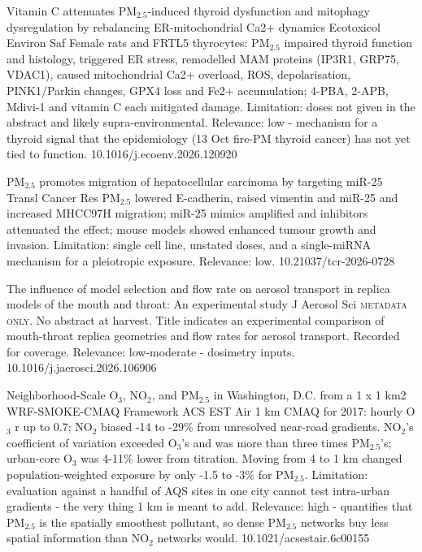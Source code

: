 \documentclass[10pt]{article}
\begin{document}
{Vitamin C attenuates PM$_{2.5}$-induced thyroid dysfunction and mitophagy dysregulation by rebalancing ER-mitochondrial Ca2+ dynamics}
{Ecotoxicol Environ Saf}
{Female rats and FRTL5 thyrocytes: PM$_{2.5}$ impaired thyroid function and histology, triggered ER stress, remodelled MAM proteins (IP3R1, GRP75, VDAC1), caused mitochondrial Ca2+ overload, ROS, depolarisation, PINK1/Parkin changes, GPX4 loss and Fe2+ accumulation; 4-PBA, 2-APB, Mdivi-1 and vitamin C each mitigated damage. Limitation: doses not given in the abstract and likely supra-environmental. Relevance: low - mechanism for a thyroid signal that the epidemiology (13 Oct fire-PM thyroid cancer) has not yet tied to function.}
{10.1016/j.ecoenv.2026.120920}

{PM$_{2.5}$ promotes migration of hepatocellular carcinoma by targeting miR-25}
{Transl Cancer Res}
{PM$_{2.5}$ lowered E-cadherin, raised vimentin and miR-25 and increased MHCC97H migration; miR-25 mimics amplified and inhibitors attenuated the effect; mouse models showed enhanced tumour growth and invasion. Limitation: single cell line, unstated doses, and a single-miRNA mechanism for a pleiotropic exposure. Relevance: low.}
{10.21037/tcr-2026-0728}

{The influence of model selection and flow rate on aerosol transport in replica models of the mouth and throat: An experimental study}
{J Aerosol Sci}
{\textsc{metadata only.} No abstract at harvest. Title indicates an experimental comparison of mouth-throat replica geometries and flow rates for aerosol transport. Recorded for coverage. Relevance: low-moderate - dosimetry inputs.}
{10.1016/j.jaerosci.2026.106906}

\par{}\baselineskip{}\baselineskip
{}

{Neighborhood-Scale O$_3$, NO$_2$, and PM$_{2.5}$ in Washington, D.C. from a 1 x 1 km2 WRF-SMOKE-CMAQ Framework}
{ACS EST Air}
{1 km CMAQ for 2017: hourly O$_3$ r up to 0.7; NO$_2$ biased -14 to -29\% from unresolved near-road gradients. NO$_2$'s coefficient of variation exceeded O$_3$'s and was more than three times PM$_{2.5}$'s; urban-core O$_3$ was 4-11\% lower from titration. Moving from 4 to 1 km changed population-weighted exposure by only -1.5 to -3\% for PM$_{2.5}$. Limitation: evaluation against a handful of AQS sites in one city cannot test intra-urban gradients - the very thing 1 km is meant to add. Relevance: high - quantifies that PM$_{2.5}$ is the spatially smoothest pollutant, so dense PM$_{2.5}$ networks buy less spatial information than NO$_2$ networks would.}
{10.1021/acsestair.6c00155}
\end{document}

